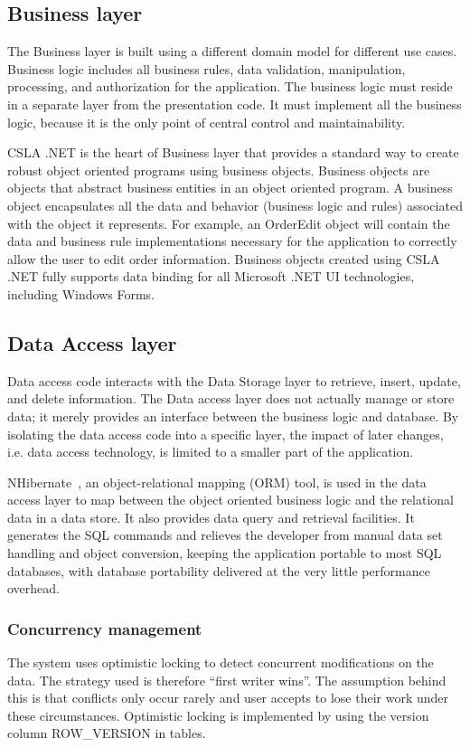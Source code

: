 \subsection{Business layer}
The Business layer is built using a different domain model for different use cases. Business logic includes all business rules, data validation, manipulation, processing, and authorization for the application. The business logic must reside in a separate layer from the presentation code. It must implement all the business logic, because it is the only point of central control and maintainability. 
\par
CSLA .NET is the heart of Business layer that provides a standard way to create robust object oriented programs using business objects. Business objects are objects that abstract business entities in an object oriented program. A business object encapsulates all the data and behavior (business logic and rules) associated with the object it represents. For example, an OrderEdit object will contain the data and business rule implementations necessary for the application to correctly allow the user to edit order information. Business objects created using CSLA .NET fully supports data binding for all Microsoft .NET UI technologies, including Windows Forms.
%

\subsection{Data Access layer}
Data access code interacts with the Data Storage layer to retrieve, insert, update, and delete information. The Data access layer does not actually manage or store data; it merely provides an interface between the business logic and database.  By isolating the data access code into a specific layer, the impact of later changes, i.e. data access technology, is limited to a smaller part of the application.
\par
NHibernate~\cite{NRD}, an object-relational mapping (ORM) tool, is used in the data access layer to map between the object oriented business logic and the relational data in a data store. It also provides data query and retrieval facilities. It generates the SQL commands and relieves the developer from manual data set handling and object conversion, keeping the application portable to most SQL databases, with database portability delivered at the very little performance overhead.
%

\subsubsection{Concurrency management}
The system uses optimistic locking to detect concurrent modifications on the data. The strategy used is therefore “first writer wins”. The assumption behind this is that conflicts only occur rarely and user accepts to lose their work under these circumstances.
Optimistic locking is implemented by using the version column ROW\_VERSION in tables.
%


